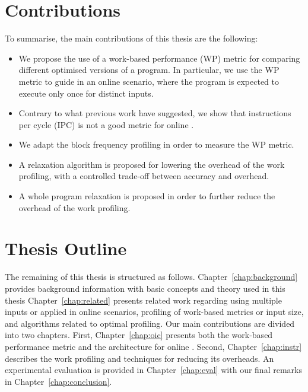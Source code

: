 \section{Contributions}


To summarise, the main contributions of this thesis are the following:
\begin{itemize}
\item We propose the use of a work-based performance (WP) metric for comparing different optimised versions of a program.
      In particular, we use the WP metric to guide {\itercomp} in an online scenario, where the program is expected to execute only once for distinct inputs.
       
\item Contrary to what previous work have suggested, we show that instructions per cycle (IPC) is not a good metric for online {\itercomp}.
\item We adapt the block frequency profiling in order to measure the WP metric.
\item A relaxation algorithm is proposed for lowering the overhead of the work profiling, with a controlled trade-off between accuracy and overhead.
\item A whole program relaxation is proposed in order to further reduce the overhead of the work profiling.
\end{itemize}

\section{Thesis Outline}

The remaining of this thesis is structured as follows.
Chapter~\ref{chap:background} provides background information with basic concepts and theory used in this thesis
Chapter~\ref{chap:related} presents related work regarding {\itercomp} using multiple inputs or applied in online scenarios,
profiling of work-based metrics or input size, and algorithms related to optimal profiling.
Our main contributions are divided into two chapters.
First, Chapter~\ref{chap:oic} presents both the work-based performance metric and the architecture for online {\itercomp}.
Second, Chapter~\ref{chap:instr} describes the work profiling and techniques for reducing its overheads.
An experimental evaluation is provided in Chapter~\ref{chap:eval} with our final remarks in Chapter~\ref{chap:conclusion}.
